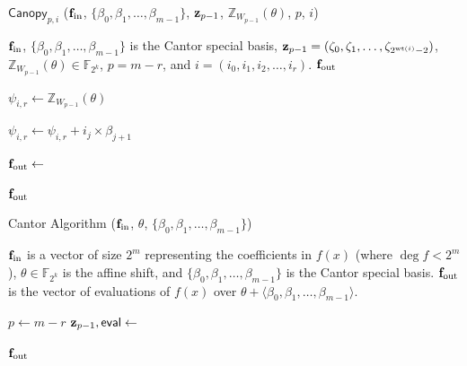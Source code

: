 \begin{algorithm}[h]
	\caption{$\mathsf{Canopy}_{p, i}$ (${\bf{f}}_\text{in}$, $\{\beta_0, \beta_1, \ldots, \beta_{m-1}\}$, ${\bf{z}}_{p-1}$, $\mathbb{Z}_{W_{p-1}}(\theta)$, $p$, $i$)}
	\label{Algo:Canopy}
	\begin{algorithmic}[1]
		\Require ${\bf{f}}_\text{in}$, $\{\beta_0, \beta_1, \ldots, \beta_{m-1}\}$ is the Cantor special basis, 
		${\bf{z}}_{p-1} = (\zeta_0, \zeta_1, \ldots, \zeta_{2^{\text{wt}(i)}-2})$, 
		$\mathbb{Z}_{W_{p-1}}(\theta) \in \mathbb{F}_{2^k}$, 
		$p = m-r$, and $i = (i_0, i_1, i_2, \ldots, i_r)$.
		\Ensure ${\bf{f}}_\text{out}$
		
		\State $\psi_{i, r} \gets \mathbb{Z}_{W_{p-1}}(\theta)$
		
		\State $\psi_{i, r} \gets \psi_{i, r} + i_j \times \beta_{j+1}$ \label{line:canopy-psi}
		\EndFor
		
		\State ${\bf{f}}_\text{out} \gets$    
		
		\State \Return ${\bf{f}}_\text{out}$
	\end{algorithmic}
\end{algorithm}


\begin{algorithm}[h]
	\caption{Cantor Algorithm (${\bf{f}}_\text{in}$, $\theta$, $\{\beta_0, \beta_1, \ldots, \beta_{m-1}\}$)}
	\label{Algo:Cantor_Implementation}
	\begin{algorithmic}[1]
		\Require ${\bf{f}}_\text{in}$ is a vector of size $2^m$ representing the coefficients in $f(x)$ (where $\deg{f} < 2^m$), 
		$\theta \in \mathbb{F}_{2^k}$ is the affine shift, 
		and $\{\beta_0, \beta_1, \ldots, \beta_{m-1}\}$ is the Cantor special basis.
		\Ensure ${\bf{f}}_\text{out}$ is the vector of evaluations of $f(x)$ over $\theta + \langle \beta_0, \beta_1, \ldots, \beta_{m-1} \rangle$.
		
		\State $p \gets m - r$
		\State ${\bf{z}}_{p-1}, \mathsf{eval} \gets$   \label{line:cantor-vanishing}
		
		\State {} 
		\EndFor
		\EndFor
		
		\State \Return ${\bf{f}}_\text{out}$
	\end{algorithmic}
\end{algorithm}


